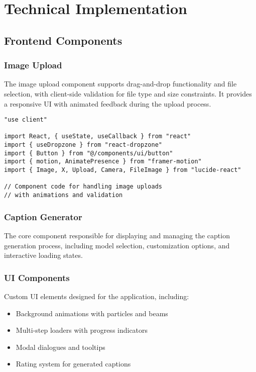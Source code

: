 \documentclass[12pt,a4paper]{report}
\begin{document}
\chapter{Technical Implementation}
\section{Frontend Components}
\subsection{Image Upload}
The image upload component supports drag-and-drop functionality and file selection, with client-side validation for file type and size constraints. It provides a responsive UI with animated feedback during the upload process.

\begin{lstlisting}[language=tsx, caption=Image Upload Component]
"use client"

import React, { useState, useCallback } from "react"
import { useDropzone } from "react-dropzone"
import { Button } from "@/components/ui/button"
import { motion, AnimatePresence } from "framer-motion"
import { Image, X, Upload, Camera, FileImage } from "lucide-react"

// Component code for handling image uploads
// with animations and validation
\end{lstlisting}

\subsection{Caption Generator}
The core component responsible for displaying and managing the caption generation process, including model selection, customization options, and interactive loading states.

\subsection{UI Components}
Custom UI elements designed for the application, including:
\begin{itemize}
    \item Background animations with particles and beams
    \item Multi-step loaders with progress indicators
    \item Modal dialogues and tooltips
    \item Rating system for generated captions
\end{itemize}
\end{document}
